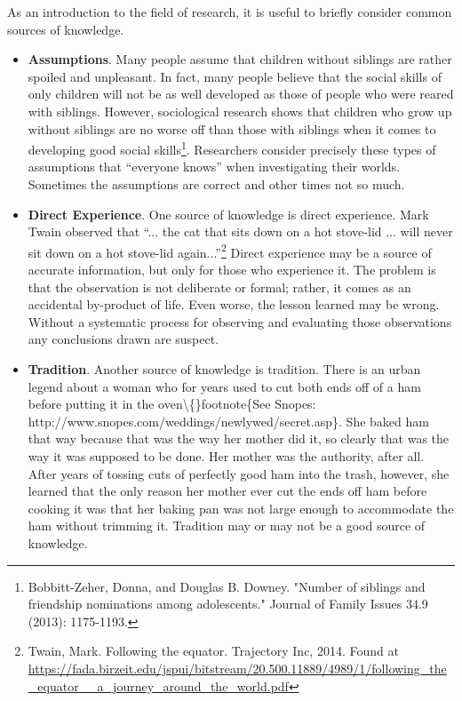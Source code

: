 As an introduction to the field of research, it is useful to briefly consider common sources of knowledge. 

\begin{itemize}
	\item \textbf{Assumptions}. Many people assume that children without siblings are rather spoiled and unpleasant. In fact, many people believe that the social skills of only children will not be as well developed as those of people who were reared with siblings. However, sociological research shows that children who grow up without siblings are no worse off than those with siblings when it comes to developing good social skills\footnote{Bobbitt-Zeher, Donna, and Douglas B. Downey. "Number of siblings and friendship nominations among adolescents." Journal of Family Issues 34.9 (2013): 1175-1193.}. Researchers consider precisely these types of assumptions that ``everyone knows'' when investigating their worlds. Sometimes the assumptions are correct and other times not so much.
	
	\item \textbf{Direct Experience}. One source of knowledge is direct experience. Mark Twain observed that ``... the cat that sits down on a hot stove-lid ... will never sit down on a hot stove-lid again...''\footnote{Twain, Mark. Following the equator. Trajectory Inc, 2014. Found at \url{https://fada.birzeit.edu/jspui/bitstream/20.500.11889/4989/1/following_the_equator__a_journey_around_the_world.pdf}} Direct experience may be a source of accurate information, but only for those who experience it. The problem is that the observation is not deliberate or formal; rather, it comes as an accidental by-product of life. Even worse, the lesson learned may be wrong. Without a systematic process for observing and evaluating those observations any conclusions drawn are suspect.

	\item \textbf{Tradition}. Another source of knowledge is tradition. There is an urban legend about a woman who for years used to cut both ends off of a ham before putting it in the oven\textbackslash\{\}footnote\{See Snopes: http://www.snopes.com/weddings/newlywed/secret.asp\}. She baked ham that way because that was the way her mother did it, so clearly that was the way it was supposed to be done. Her mother was the authority, after all. After years of tossing cuts of perfectly good ham into the trash, however, she learned that the only reason her mother ever cut the ends off ham before cooking it was that her baking pan was not large enough to accommodate the ham without trimming it. Tradition may or may not be a good source of knowledge.
	

\end{itemize}
